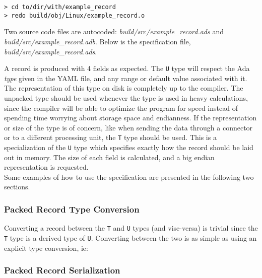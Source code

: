 \vspace{5mm} %
\begin{verbatim}
> cd to/dir/with/example_record
> redo build/obj/Linux/example_record.o
\end{verbatim}
\vspace{5mm} %

Two source code files are autocoded: \textit{build/src/example\_record.ads} and \textit{build/src/example\_record.adb}. Below is the specification file, \textit{build/src/example\_record.ads}.


A record is produced with 4 fields as expected. The \texttt{U} type will respect the Ada \textit{type} given in the YAML file, and any range or default value associated with it. The representation of this type on disk is completely up to the compiler. The unpacked type should be used whenever the type is used in heavy calculations, since the compiler will be able to optimize the program for speed instead of spending time worrying about storage space and endianness. If the representation or size of the type is of concern, like when sending the data through a connector or to a different processing unit, the \texttt{T} type should be used. This is a specialization of the \texttt{U} type which specifies exactly how the record should be laid out in memory. The size of each field is calculated, and a big endian representation is requested. \\ 

Some examples of how to use the specification are presented in the following two sections.

\subsubsection{Packed Record Type Conversion} \label{Packed Record Type Conversion}

Converting a record between the \texttt{T} and \texttt{U} types (and vise-versa) is trivial since the \texttt{T} type is a derived type of \texttt{U}. Converting between the two is as simple as using an explicit type conversion, ie:


\subsubsection{Packed Record Serialization} \label{Packed Record Serialization}

